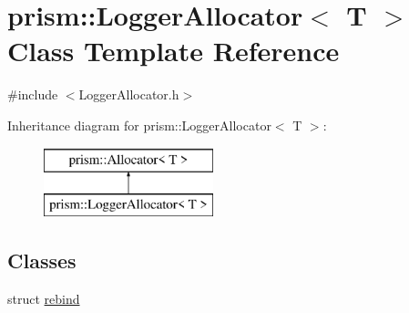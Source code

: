 \hypertarget{classprism_1_1_logger_allocator}{}\section{prism\+:\+:Logger\+Allocator$<$ T $>$ Class Template Reference}
\label{classprism_1_1_logger_allocator}


{\ttfamily \#include $<$Logger\+Allocator.\+h$>$}

Inheritance diagram for prism\+:\+:Logger\+Allocator$<$ T $>$\+:\begin{figure}[H]
\begin{center}
\leavevmode
\includegraphics[height=2.000000cm]{classprism_1_1_logger_allocator}
\end{center}
\end{figure}
\subsection*{Classes}
\begin{DoxyCompactItemize}
\item 
struct \hyperlink{structprism_1_1_logger_allocator_1_1rebind}{rebind}
\end{DoxyCompactItemize}
